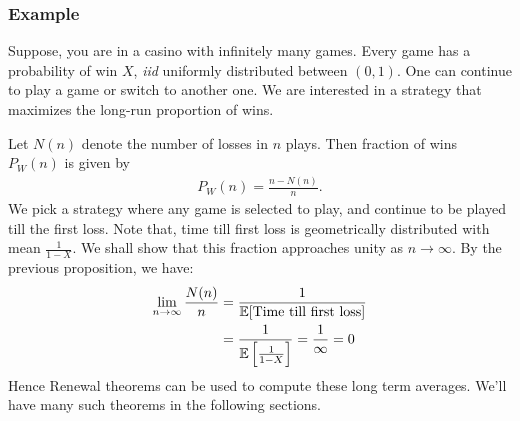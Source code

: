 \documentclass[a4paper,10pt, english]{article}
\begin{document}
\subsubsection{Example}
Suppose, you are in a casino with infinitely many games. Every game has a probability of win $X$, \emph{iid} uniformly distributed between $(0,1)$. One can continue to play a game or switch to another one. We are interested in a strategy that maximizes the long-run proportion of wins.

Let $N(n)$ denote the number of losses in $n$ plays. Then fraction of wins $P_W(n)$ is given by 
\begin{align*}
P_W(n) = \frac{n-N(n)}{n}.
\end{align*}
We pick a strategy where any game is selected to play, and continue to be played till the first loss. Note that, time till first loss is geometrically distributed with mean $\frac{1}{1-X}$. We shall show that this fraction approaches unity as $n \to \infty$. By the previous proposition, we have:
\begin{align*}
\lim_{n \to \infty} \frac{N(n)}{n} &= \frac{1}{\mathbb{E}[\mbox{Time till first loss}]} \\
&= \frac{1}{\mathbb{E}\left[\frac{1}{1-X}\right]} = \frac{1}{\infty} = 0
\end{align*}
Hence Renewal theorems can be used to compute these long term averages. We'll have many such theorems in the following sections.
\end{document}
